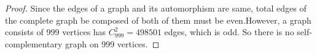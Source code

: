 
\begin{proof}
Since the edges of a graph and its automorphism are same, total edges of the complete graph be composed of both of them must be even.However, a graph consists of 999 vertices has $C_{999}^2=498501$ edges, which is odd. So there is no self-complementary graph on 999 vertices.
\end{proof}


